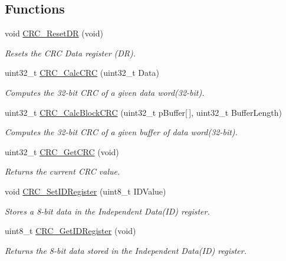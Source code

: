 \subsection*{Functions}
\begin{DoxyCompactItemize}
\item 
void \hyperlink{group___c_r_c___private___functions_ga506467d5ef873a5a4ade4ae83cb110f6}{C\+R\+C\+\_\+\+Reset\+DR} (void)
\begin{DoxyCompactList}\small\item\em Resets the C\+RC Data register (DR). \end{DoxyCompactList}\item 
uint32\+\_\+t \hyperlink{group___c_r_c___private___functions_ga5407fdbb8e8c9be6322cc8856ae5db3b}{C\+R\+C\+\_\+\+Calc\+C\+RC} (uint32\+\_\+t Data)
\begin{DoxyCompactList}\small\item\em Computes the 32-\/bit C\+RC of a given data word(32-\/bit). \end{DoxyCompactList}\item 
uint32\+\_\+t \hyperlink{group___c_r_c___private___functions_gab15ebf620615c360048fb4f45b15fae6}{C\+R\+C\+\_\+\+Calc\+Block\+C\+RC} (uint32\+\_\+t p\+Buffer\mbox{[}$\,$\mbox{]}, uint32\+\_\+t Buffer\+Length)
\begin{DoxyCompactList}\small\item\em Computes the 32-\/bit C\+RC of a given buffer of data word(32-\/bit). \end{DoxyCompactList}\item 
uint32\+\_\+t \hyperlink{group___c_r_c___private___functions_gab62db4561b0558f3c8ed53887fe7de8b}{C\+R\+C\+\_\+\+Get\+C\+RC} (void)
\begin{DoxyCompactList}\small\item\em Returns the current C\+RC value. \end{DoxyCompactList}\item 
void \hyperlink{group___c_r_c___private___functions_ga769c9a42be57b972ae61bbada0f2e46a}{C\+R\+C\+\_\+\+Set\+I\+D\+Register} (uint8\+\_\+t I\+D\+Value)
\begin{DoxyCompactList}\small\item\em Stores a 8-\/bit data in the Independent Data(\+I\+D) register. \end{DoxyCompactList}\item 
uint8\+\_\+t \hyperlink{group___c_r_c___private___functions_gaf869f6e9c3ca0ae0822cfad1abea7e5f}{C\+R\+C\+\_\+\+Get\+I\+D\+Register} (void)
\begin{DoxyCompactList}\small\item\em Returns the 8-\/bit data stored in the Independent Data(\+I\+D) register. \end{DoxyCompactList}\end{DoxyCompactItemize}


